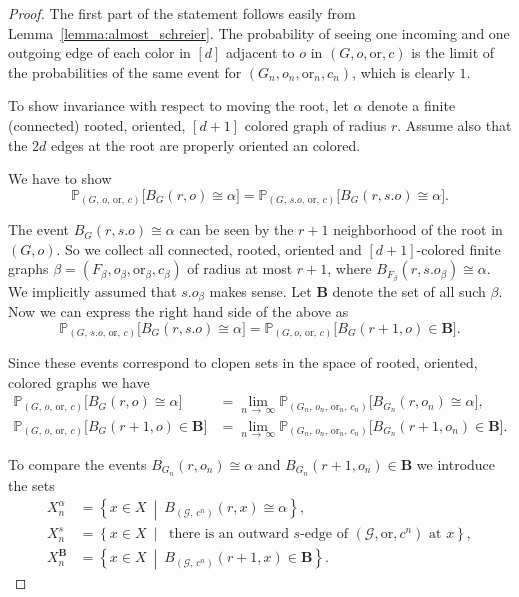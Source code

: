 \documentclass[11pt]{article}
\theoremstyle{definition}
\numberwithin{equation}{section}
\numberwithin{figure}{section}
\numberwithin{table}{section}
\newcommand{\bfB}{\mathbf{B}}
\newcommand{\bbP}{\mathbb{P}}
\newcommand{\G}{\mathcal{G}}
\newcommand{\orl}{\mathrm{or}}
\begin{document}
\begin{proof}
The first part of the statement follows easily from Lemma~\ref{lemma:almost_schreier}. The probability of seeing one incoming and one outgoing edge of each color in $[d]$ adjacent to $o$ in $(G,o,\orl, c)$ is the limit of the probabilities of the same event for $(G_n,o_n,\orl_n,c_n)$, which is clearly $1$.

To show invariance with respect to moving the root, let $\alpha$ denote a finite (connected) rooted, oriented, $[d+1]$ colored graph of radius $r$. Assume also that the $2d$ edges at the root are properly oriented an colored.

We have to show
\[
\bbP_{\left(G,\,o,\,\orl,\,c\right)}\big[B_G(r,o) \cong \alpha\big] = \bbP_{\left(G,\,s.o,\,\orl,\,c\right)}\big[B_G(r,s.o) \cong \alpha\big].
\]

The event $B_G(r,s.o) \cong \alpha$ can be seen by the $r+1$ neighborhood of the root in $(G,o)$. So we collect all connected, rooted, oriented and $[d+1]$-colored finite graphs $\beta=(F_{\beta},o_{\beta},\orl_{\beta}, c_{\beta})$ of radius at most $r+1$, where $B_{F_{\beta}}(r,s.o_{\beta}) \cong \alpha$. We implicitly assumed that $s.o_{\beta}$ makes sense. Let $\bfB$ denote the set of all such $\beta$. Now we can express the right hand side of the above as
\[
\bbP_{\left(G,\,s.o,\,\orl,\,c\right)}\big[B_G(r,s.o) \cong \alpha\big] = \bbP_{\left(G,o,\,\orl,\,c\right)}\big[B_G(r+1,o) \in \bfB\big].
\]

Since these events correspond to clopen sets in the space of rooted, oriented, colored graphs we have
\begin{align*}
\bbP_{\left(G,\,o,\,\orl,\,c\right)}\big[B_G(r,o) \cong \alpha\big] &= \lim_{n\,\to\,\infty} \bbP_{\left(G_n,\,o_n,\,\orl_n,\,c_n\right)}\big[B_{G_n}(r,o_n) \cong \alpha\big],
\\
\bbP_{\left(G,\,o,\,\orl,\,c\right)}\big[B_G\left(r+1,o\right) \in \bfB\big] &=
\lim_{n\,\to\,\infty}
\bbP_{\left(G_n,\,o_n,\,\orl_n,\,c_n\right)}\big[B_{G_n}\left(r+1,o_n\right) \in \bfB\big].
\end{align*}

To compare the events $B_{G_n}(r,o_n) \cong \alpha$ and $B_{G_n}(r+1,o_n) \in \bfB$ we introduce the sets
\begin{align*}
X^{\alpha}_{n}&=\left\{x \in X~\middle|~B_{\left(\G,\,c^n\right)}(r,x) \cong \alpha\right\},
\\
X^s_n &=\left\{x \in X~\middle|~\text{ there is an outward $s$-edge of }\left(\G,\orl,c^n\right)\text{ at } x\right\},
\\
X^{\bfB}_{n} &=\left\{x \in X~\middle|~B_{\left(\G,\,c^n\right)}(r+1,x) \in \bfB\right\}.
\end{align*}


\end{proof}
\end{document}
